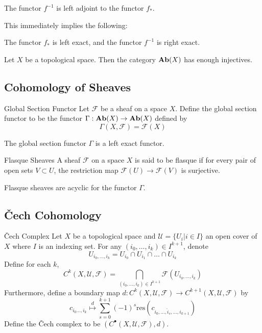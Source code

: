 \documentclass[a4paper]{article}
\begin{document}
\begin{prp}{}{} The functor $f^{-1}$ is left adjoint to the functor $f_\ast$. 
\end{prp}

This immediately implies the following: 
\begin{prp}{}{} The functor $f_\ast$ is left exact, and the functor $f^{-1}$ is right exact. 
\end{prp}

\begin{prp}{}{} Let $X$ be a topological space. Then the category $\bold{Ab}(X)$ has enough injectives. 
\end{prp}

\subsection{Cohomology of Sheaves}
\begin{defn}{Global Section Functor}{} Let $\mathcal{F}$ be a sheaf on a space $X$. Define the global section functor to be the functor $\Gamma:\bold{Ab}(X)\to\bold{Ab}(X)$ defined by $$\Gamma(X,\mathcal{F})=\mathcal{F}(X)$$
\end{defn}

\begin{lmm}{}{} The global section functor $\Gamma$ is a left exact functor. 
\end{lmm}

\begin{defn}{Flasque Sheaves}{} A sheaf $\mathcal{F}$ on a space $X$ is said to be flasque if for every pair of open sets $V\subset U$, the restriction map $\mathcal{F}(U)\to\mathcal{F}(V)$ is surjective. 
\end{defn}

\begin{prp}{}{} Flasque sheaves are acyclic for the functor $\Gamma$. 
\end{prp}

\subsection{\v{C}ech Cohomology}
\begin{defn}{\v{C}ech Complex}{} Let $X$ be a topological space and $\mathcal{U}=\{U_i|i\in I\}$ an open cover of $X$ where $I$ is an indexing set. For any $(i_0,\dots,i_k)\in I^{k+1}$, denote $$U_{i_0,\dots,i_k}=U_{i_0}\cap U_{i_1}\cap\dots\cap U_{i_k}$$ Define for each $k$, $$C^k(X,\mathcal{U},\mathcal{F})=\bigcap_{(i_0,\dots,i_k)\in I^{k+1}}\mathcal{F}(U_{i_0,\dots,i_k})$$ Furthermore, define a boundary map $d:C^k(X,\mathcal{U},\mathcal{F})\to C^{k+1}(X,\mathcal{U},\mathcal{F})$ by $$c_{i_0\dots,i_k}\overset{d}{\mapsto}\sum_{s=0}^{k+1}(-1)^s\text{res}(c_{i_0,\dots,\hat{i}_s,\dots,i_{k+1}})$$ Define the \v{C}ech complex to be $(C^\bullet(X,\mathcal{U},\mathcal{F}),d)$. 
\end{defn}
\end{document}
